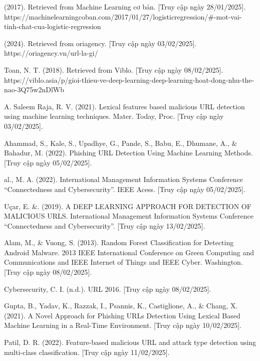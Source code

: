 \documentclass[13pt]{article}
\begin{document}
\begin{thebibliography}{99}

(2017). Retrieved from Machine Learning cơ bản. [Truy cập ngày 28/01/2025]. \\
https://machinelearningcoban.com/2017/01/27/logisticregression/#-mot-vai-tinh-chat-cua-logistic-regression

(2024). Retrieved from oriagency. [Truy cập ngày 03/02/2025]. \\
https://oriagency.vn/url-la-gi/

Toan, N. T. (2018). Retrieved from Viblo. [Truy cập ngày 08/02/2025]. \\
https://viblo.asia/p/gioi-thieu-ve-deep-learning-deep-learning-hoat-dong-nhu-the-nao-3Q75w2nDlWb

A. Saleem Raja, R. V. (2021). Lexical features based malicious URL detection using machine learning techniques. Mater. Today, Proc. [Truy cập ngày 03/02/2025].  

Ahammad, S., Kale, S., Upadhye, G., Pande, S., Babu, E., Dhumane, A., \& Bahadur, M. (2022). Phishing URL Detection Using Machine Learning Methods. [Truy cập ngày 05/02/2025].  

al., M. A. (2022). International Management Information Systems Conference “Connectedness and Cybersecurity”. IEEE Acess. [Truy cập ngày 05/02/2025]. 

Uçar, E. \&. (2019). A DEEP LEARNING APPROACH FOR DETECTION OF MALICIOUS URLS. International Management Information Systems Conference “Connectedness and Cybersecurity”. [Truy cập ngày 13/02/2025].

Alam, M., \& Vuong, S. (2013). Random Forest Classification for Detecting Android Malware. 2013 IEEE International Conference on Green Computing and Communications and IEEE Internet of Things and IEEE Cyber. Washington. [Truy cập ngày 08/02/2025].

Cybersecurity, C. I. (n.d.). URL 2016. [Truy cập ngày 08/02/2025]. 

Gupta, B., Yadav, K., Razzak, I., Psannis, K., Castiglione, A., \& Chang, X. (2021). A Novel Approach for Phishing URLs Detection Using Lexical Based Machine Learning in a Real-Time Environment. [Truy cập ngày 10/02/2025].

Patil, D. R. (2022). Feature-based malicious URL and attack type detection using multi-class classification. [Truy cập ngày 11/02/2025].  


\end{thebibliography}
\end{document}
